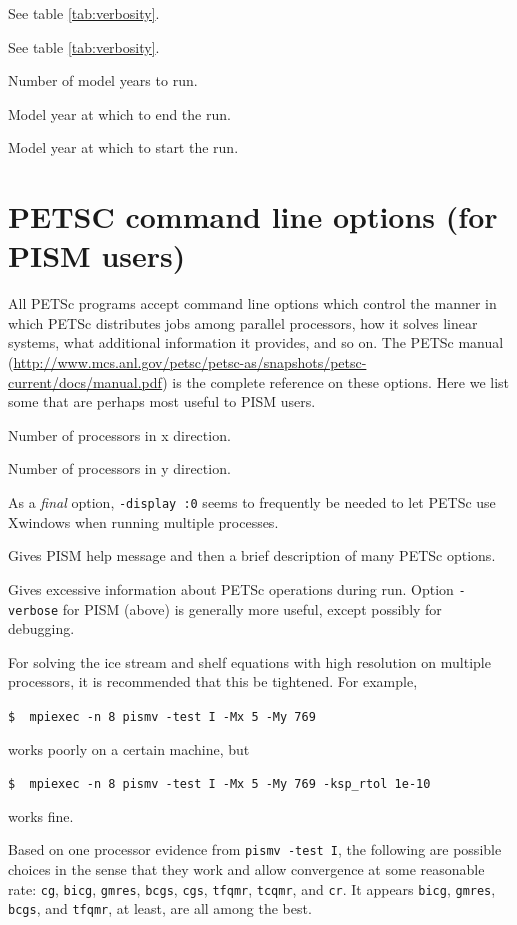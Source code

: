 \documentclass[11pt,final]{amsart}
\renewcommand{\t}[1]{\texttt{#1}}
\begin{document}
   See table \ref{tab:verbosity}.

   See table \ref{tab:verbosity}.

 Number of model years to run.

 Model year at which to end the run.

 Model year at which to start the run.


\clearpage\newpage
\section{PETSC command line options (for PISM users)}  All PETSc programs accept command line options which control the manner in which PETSc distributes jobs among parallel processors, how it solves linear systems, what additional information it provides, and so on.  The PETSc manual (\url{http://www.mcs.anl.gov/petsc/petsc-as/snapshots/petsc-current/docs/manual.pdf}) is the complete reference on these options.  Here we list some that are perhaps most useful to PISM users.

  Number of processors in x direction.

  Number of processors in y direction.

  As a \emph{final} option, \verb|-display :0| seems to frequently be needed to let PETSc use Xwindows when running multiple processes.

  Gives PISM help message and then a brief description of many PETSc options.

  Gives excessive information about PETSc operations during run.  Option \verb|-verbose| for PISM (above) is generally more useful, except possibly for debugging.

  For solving the ice stream and shelf equations with high resolution on multiple processors, it is recommended that this be tightened.  For example, 

\verb|$  mpiexec -n 8 pismv -test I -Mx 5 -My 769|

\noindent works poorly on a certain machine, but

\verb|$  mpiexec -n 8 pismv -test I -Mx 5 -My 769 -ksp_rtol 1e-10|

\noindent works fine.

  Based on one processor evidence from \verb|pismv -test I|, the following are possible choices in the sense that they work and allow convergence at some reasonable rate: \t{cg}, \t{bicg}, \t{gmres}, \t{bcgs}, \t{cgs}, \t{tfqmr}, \t{tcqmr}, and \t{cr}.  It appears \t{bicg}, \t{gmres}, \t{bcgs}, and \t{tfqmr}, at least, are all among the best.
\end{document}
